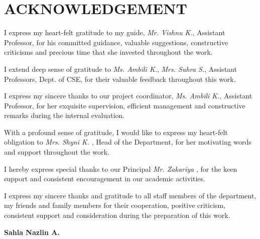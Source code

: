 \chapter*{ACKNOWLEDGEMENT}

\begin{acknowledgement}
\newcommand{\tab}{\hspace*{2em}}

\hspace{0.75cm} I express my heart-felt gratitude to  my guide, \emph{Mr. Vishnu K.}, Assistant Professor, for his committed guidance, valuable suggestions, constructive criticisms and precious time that she invested throughout the work. %

I extend deep sense of gratitude to  \emph{Ms. Ambili K.}, \emph{Mrs. Suhra S.}, Assistant Professors, Dept. of CSE, for their valuable feedback  throughout this work.


I express my sincere thanks to our project coordinator, \emph{Ms. Ambili K.}, Assistant Professor, for her exquisite supervision, efficient management and constructive remarks during the internal evaluation.


With a profound sense of gratitude, I would like to express my heart-felt obligation to \emph{Mrs. Shyni K. }, Head of the Department, for her motivating words and support throughout the work.

I hereby express special thanks to our Principal \emph{Mr. Zakariya }, for the keen support and consistent encouragement in our academic activities. 

I express my sincere thanks and gratitude to all staff members of the department, my friends and family members for their cooperation, positive criticism, consistent support and consideration during the preparation of this work.

\vspace *{2 cm}
\begin{raggedright}
\vspace*{5mm}
\hspace*{112mm}
\textbf{Sahla Nazlin A.}
\end{raggedright}



\end{acknowledgement}